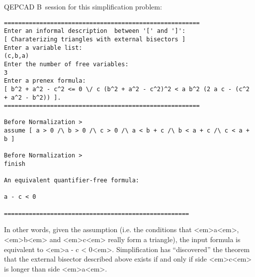 QEPCAD B\ session for this simplification problem:
{\tiny
\begin{verbatim}
=======================================================
Enter an informal description  between '[' and ']':
[ Charaterizing triangles with external bisectors ]
Enter a variable list:
(c,b,a)
Enter the number of free variables:
3
Enter a prenex formula:
[ b^2 + a^2 - c^2 <= 0 \/ c (b^2 + a^2 - c^2)^2 < a b^2 (2 a c - (c^2 + a^2 - b^2)) ].
=======================================================

Before Normalization >
assume [ a > 0 /\ b > 0 /\ c > 0 /\ a < b + c /\ b < a + c /\ c < a + b ]

Before Normalization >
finish

An equivalent quantifier-free formula:

a - c < 0

====================================================
\end{verbatim}
}
In other words, given the assumption (i.e. the conditions that <em>a<em>,
<em>b<em> and <em>c<em> really form a triangle), the input formula is equivalent
to <em>a - c < 0<em>.  Simplification has ``discovered'' the theorem
that the external bisector described above exists if and only if side
<em>c<em> is longer than side <em>a<em>.
